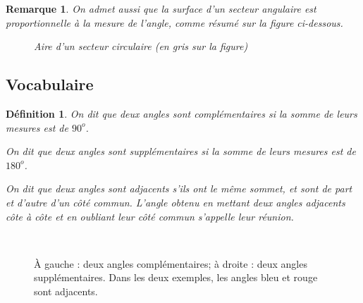 \documentclass[12 pt]{article}
\theoremstyle{plain}
\newcounter{n}
\numberwithin{n}{section}
\newtheorem*{df}{Définition}
\newtheorem*{rmq}{Remarque}
\begin{document}
\begin{rmq}
On admet aussi que la surface d'un secteur angulaire est proportionnelle à la mesure de l'angle, comme 
résumé sur la figure ci-dessous. \begin{figure}[H]\center
{}
\caption{Aire d'un secteur circulaire (en gris sur la figure)}
\end{figure}
\end{rmq}

\subsection{Vocabulaire}

\begin{df}
On dit que deux angles sont \emph{complémentaires} si la somme de leurs mesures est de $90^o$. 

On dit que deux angles sont \emph{supplémentaires} si la somme de leurs mesures est de $180^o$. 

On dit que deux angles sont \emph{adjacents} s'ils ont le même sommet, et sont de part et d'autre d'un côté commun.
L'angle obtenu en mettant deux angles adjacents côte à côte et en oubliant leur côté commun s'appelle leur réunion.
\end{df}
\begin{figure}[H]\center
{}\ \ \ \ \ 
\caption{À gauche : deux angles complémentaires; à droite : deux angles supplémentaires. Dans les deux exemples, les angles bleu et rouge sont adjacents.}
\end{figure}
\end{document}
